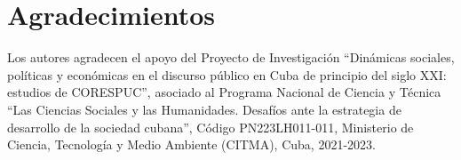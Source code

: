 \documentclass[a4paper,11pt,twocolumn,twoside]{article}
\begin{document}
\section*{Agradecimientos}

Los autores agradecen el apoyo del Proyecto de Investigación 
``Dinámicas sociales, políticas y económicas en el discurso público 
en Cuba de principio del siglo XXI: estudios de CORESPUC'', 
asociado al Programa Nacional de Ciencia y Técnica ``Las Ciencias Sociales y las Humanidades. 
Desafíos ante la estrategia de desarrollo de la sociedad cubana'', Código PN223LH011-011, Ministerio
de Ciencia, Tecnología y Medio Ambiente (CITMA), Cuba, 2021-2023.



\end{document}
